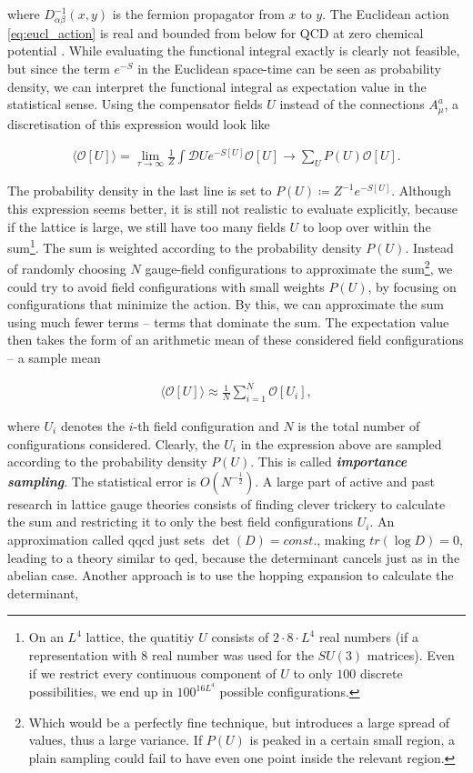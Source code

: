 \documentclass{article}
\theoremstyle{plain} %
\theoremstyle{convention} %
\theoremstyle{remark} %
\def\df#1{\textbf{\textit{#1}}}
\numberwithin{equation}{section}
\begin{document}
where $D_{\alpha \beta}^{-1}(x,y)$ is the fermion propagator from $x$ to $y$. The Euclidean action \eqref{eq:eucl_action} is real and bounded from below for QCD at zero chemical potential \cite{gupta1998}. While evaluating the functional integral exactly is clearly not feasible, but since the term $e^{-S}$ in the Euclidean space-time can be seen as probability density, we can interpret the functional integral as expectation value in the statistical sense. Using the compensator fields $U$ instead of the connections $A_{\mu}^a$, a discretisation of this expression would look like

\begin{align*}
    \langle \mathcal{O}[U] \rangle = \lim_{\tau \to \infty} \frac{1}{Z} \int \mathcal{D} U e^{-S[U]} \mathcal{O}[U] \longrightarrow \sum_U P(U) \mathcal{O}[U].
\end{align*}

The probability density in the last line is set to $P(U) \coloneqq Z^{-1} e^{-S[U]}$. Although this expression seems better, it is still not realistic to evaluate explicitly, because if the lattice is large, we still have too many fields $U$ to loop over within the sum\footnote{On an $L^4$ lattice, the quatitiy $U$ consists of $2 \cdot 8 \cdot L^4$ real numbers (if a representation with $8$ real number was used for the $SU(3)$ matrices). Even if we restrict every continuous component of $U$ to only $100$ discrete possibilities, we end up in $100^{16 L^4}$ possible configurations.}. The sum is weighted according to the probability density $P(U)$. Instead of randomly choosing $N$ gauge-field configurations to approximate the sum\footnote{Which would be a perfectly fine technique, but introduces a large spread of values, thus a large variance. If $P(U)$ is peaked in a certain small region, a plain sampling could fail to have even one point inside the relevant region.}, we could try to avoid field configurations with small weights $P(U)$, by focusing on configurations that minimize the action. By this, we can approximate the sum using much fewer terms -- terms that dominate the sum. The expectation value then takes the form of an arithmetic mean of these considered field configurations -- a sample mean

\begin{align}
    \langle \mathcal{O}[U] \rangle \approx \frac{1}{N} \sum_{i=1}^N \mathcal{O}[U_i], \label{eq:sample_mean}
\end{align}

where $U_i$ denotes the $i$-th field configuration and $N$ is the total number of configurations considered. Clearly, the $U_i$ in the expression above are sampled according to the probability density $P(U)$. This is called \df{importance sampling}. The statistical error is $O(N^{-\frac{1}{2}})$. A large part of active and past research in lattice gauge theories consists of finding clever trickery to calculate the sum and restricting it to only the best field configurations $U_i$. An approximation called \acrfull{qqcd} just sets $\det(D) = const.$, making $tr(\log D) = 0$, leading to a theory similar to \acrshort{qed}, because the determinant cancels just as in the abelian case. Another approach is to use the hopping expansion to calculate the determinant,
\end{document}
